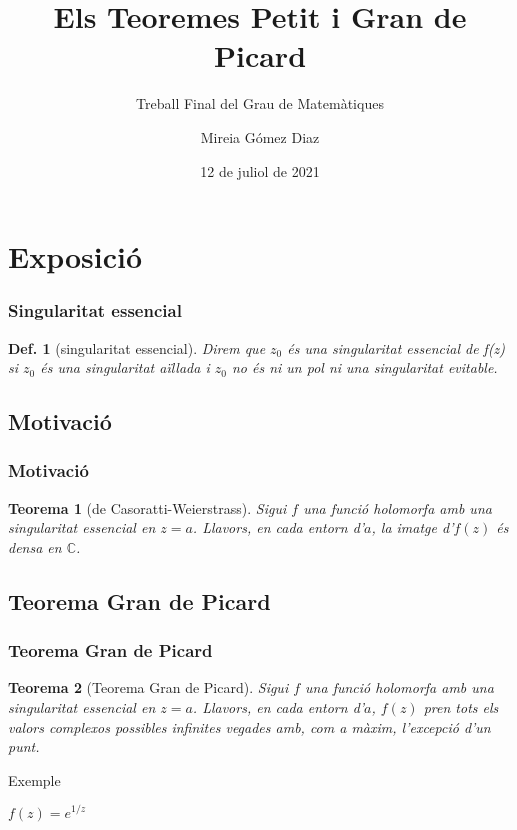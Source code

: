 \documentclass{beamer}
\title{Els Teoremes Petit i Gran de Picard}
\subtitle{Treball Final del Grau de Matemàtiques}
\author{Mireia Gómez Diaz}
\date{12 de juliol de 2021}
\newtheorem{defi}{Def.}[section]
\newtheorem{teorema}{Teorema}[section]
\begin{document}
\begin{frame}[plain,t]
\titlepage
\end{frame}


\section{Exposició}
\begin{frame}
\frametitle{Singularitat essencial}


\begin{defi}[singularitat essencial]
Direm que $z_0$ és una singularitat essencial de f(z) si $z_0$ és una singularitat aïllada i $z_0$ no és ni un pol ni una singularitat evitable. 
\end{defi}

\end{frame}


\subsection{Motivació}
\begin{frame}
\frametitle{Motivació}

\begin{teorema}[de Casoratti-Weierstrass]
Sigui $f$ una funció holomorfa amb una singularitat essencial en $z=a$. Llavors, en cada entorn d'$a$, la imatge d'$f(z)$ és densa en $\mathbb{C}$.
\end{teorema}

\end{frame}


\subsection{Teorema Gran de Picard}
\begin{frame}
\frametitle{Teorema Gran de Picard}

\begin{teorema}[Teorema Gran de Picard]
Sigui $f$ una funció holomorfa amb una singularitat essencial en $z=a$. Llavors, en cada entorn d'$a$, $f(z)$ pren tots els valors complexos possibles infinites vegades amb, com a màxim, l'excepció d'un punt.
\end{teorema}

\begin{exampleblock}{Exemple}
\begin{center}
    $f(z)=e^{1/z}$
\end{center}
\end{exampleblock}

\end{frame}
\end{document}
